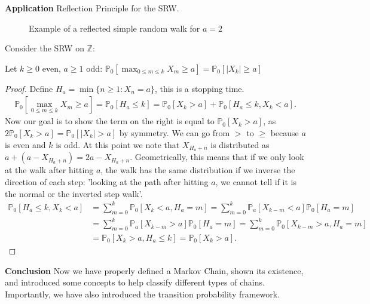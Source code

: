 \noindent
\textbf{Application} Reflection Principle for the SRW.
\begin{figure}[h!]
\begin{center}
\end{center}
\caption{Example of a reflected simple random walk for $a=2$}
\end{figure}

Consider the SRW on $\mathbb{Z}$: 

\begin{prop}[]
Let $k\geq 0$ even, $a\geq1$ odd: $\mathbb{P}_{0} \left[ \max_{0 \leq m \leq k} X_m \geq a \right] = \mathbb{P}_{0} \left[ |X_k|\geq a \right]  $
\end{prop}
\begin{proof}
	Define $H_a= \min\{n \geq 1: X_n =a\}$, this is a stopping time.
	\begin{align}
		\mathbb{P}_{0} \left[ \max_{0 \leq m \leq k}X_m \geq a \right] = \mathbb{P}_{0} \left[ H_a \leq k \right] = \mathbb{P}_{0} \left[ X_k > a \right]  + \mathbb{P}_{0} \left[ H_a \leq k, X_k < a \right] 
		.\end{align}		
		Now our goal is to show the term on the right is equal to $\mathbb{P}_{0} \left[ X_k > a \right] $, as $2\mathbb{P}_{0} \left[ X_k > a \right] = \mathbb{P}_{0} \left[ |X_k| >a \right] $ by symmetry. We can go from $>$ to $\geq$ because $a$ is even and $k$ is odd. At this point we note that $X_{H_a +n}$ is distributed as $a + (a-X_{H_a +n}) = 2a - X_{H_a +n}$. Geometrically, this means that if we only look at the walk after hitting $a$, the walk has the same distribution if we inverse the direction of each step: 'looking at the path after hitting $a$, we cannot tell if it is the normal or the inverted step walk'.
	\begin{align}
		\mathbb{P}_{0} \left[ H_a \leq k, X_k < a \right] &= \sum_{m=0}^{k} \mathbb{P}_{0} \left[ X_k < a, H_a = m \right] = \sum_{m=0}^{k} \mathbb{P}_{a} \left[ X_{k-m} < a \right] \mathbb{P}_{0} \left[ H_a = m \right]  \\
		&= \sum_{m=0}^{k} \mathbb{P}_{a} \left[ X_{k-m}>a \right] \mathbb{P}_{0} \left[ H_a = m \right] = 
			 \sum_{m=0}^{k} \mathbb{P}_{0} \left[ X_{k-m}>a, H_a =m \right] \\
		&= \mathbb{P}_{0} \left[ X_k >a, H_a \leq k \right] = \mathbb{P}_{0} \left[ X_k > a \right]  
	 .\end{align}	
\end{proof}


\noindent
\textbf{Conclusion} Now we have properly defined a Markov Chain, shown its existence, and introduced some concepts to help classify different types of chains. Importantly, we have also introduced the transition probability framework. 


